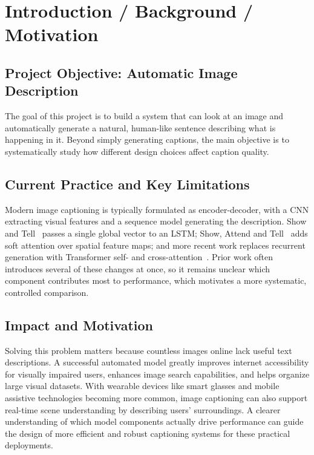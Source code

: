 \documentclass[10pt,twocolumn,letterpaper]{article}
\begin{document}
\section{Introduction / Background / Motivation}

\subsection{Project Objective: Automatic Image Description}
The goal of this project is to build a system that can look at an 
image and automatically generate a natural, human-like sentence describing 
what is happening in it. Beyond simply generating captions, the main 
objective is to systematically study how different design choices 
affect caption quality.

\subsection{Current Practice and Key Limitations}
Modern image captioning is typically formulated as encoder-decoder,
with a CNN extracting visual features and a sequence model
generating the description. Show and Tell~\cite{vinyals2015show}
passes a single global vector to an LSTM; Show, Attend and
Tell~\cite{xu2015show} adds soft attention over spatial feature
maps; and more recent work replaces recurrent generation with
Transformer self- and cross-attention~\cite{vaswani2017attention}.
Prior work often introduces several of these changes at once, so it
remains unclear which component contributes most to performance,
which motivates a more systematic, controlled comparison.

\subsection{Impact and Motivation}
Solving this problem matters because countless images online lack
useful text descriptions. A successful automated model greatly
improves internet accessibility for visually impaired users, enhances
image search capabilities, and helps organize large visual datasets.
With wearable devices like smart glasses and mobile assistive
technologies becoming more common, image captioning can also support
real-time scene understanding by describing users' surroundings. A
clearer understanding of which model components actually drive
performance can guide the design of more efficient and robust
captioning systems for these practical deployments.
\end{document}
